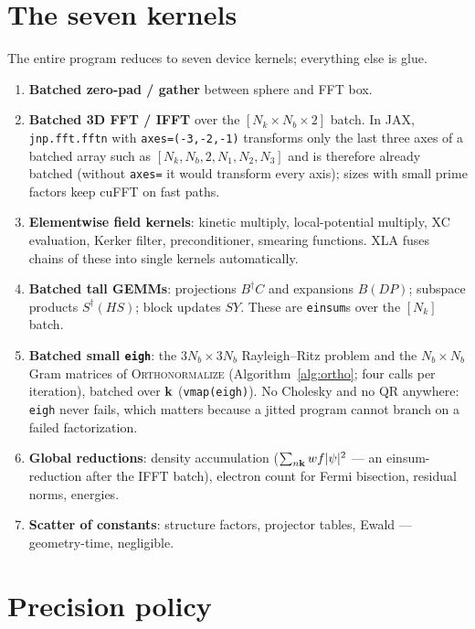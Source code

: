 \section{The seven kernels}

The entire program reduces to seven device kernels; everything else is glue.
\begin{enumerate}[leftmargin=2em]
\item \textbf{Batched zero-pad / gather} between sphere and FFT box.
\item \textbf{Batched 3D FFT / IFFT} over the $[N_k \times N_b \times 2]$
batch. In JAX, \texttt{jnp.fft.fftn} with \texttt{axes=(-3,-2,-1)} transforms
only the last three axes of a batched array such as
$[N_k, N_b, 2, N_1, N_2, N_3]$ and is therefore already batched (without
\texttt{axes=} it would transform every axis); sizes with small prime factors keep cuFFT on fast paths.
\item \textbf{Elementwise field kernels}: kinetic multiply, local-potential
multiply, XC evaluation, Kerker filter, preconditioner, smearing functions.
XLA fuses chains of these into single kernels automatically.
\item \textbf{Batched tall GEMMs}: projections $B^{\dagger}C$ and expansions
$B(DP)$; subspace products $S^{\dagger}(HS)$; block updates $SY$. These are
\texttt{einsum}s over the $[N_k]$ batch.
\item \textbf{Batched small \texttt{eigh}}: the $3N_b \times 3N_b$
Rayleigh--Ritz problem and the $N_b\times N_b$ Gram matrices of
\textsc{Orthonormalize} (Algorithm~\ref{alg:ortho}; four calls per
iteration), batched over $\mathbf{k}$
(\texttt{vmap(eigh)}). No Cholesky and no QR anywhere: \texttt{eigh} never
fails, which matters because a jitted program cannot branch on a failed
factorization.
\item \textbf{Global reductions}: density accumulation
($\sum_{n\mathbf{k}} w f |\psi|^2$ --- an einsum-reduction after the IFFT batch),
electron count for Fermi bisection, residual norms, energies.
\item \textbf{Scatter of constants}: structure factors, projector tables,
Ewald --- geometry-time, negligible.
\end{enumerate}

\section{Precision policy}

